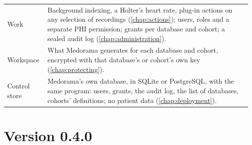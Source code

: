 \begin{table}[htbp]
\begin{tabularx}{\linewidth}{@{}P{2.9cm}L@{}}
Work & Background indexing, a Holter's heart rate, plug-in actions on any selection of
  recordings (\cref{chap:actions}); users, roles and a separate PHI permission; grants per
  database and cohort; a sealed audit log (\cref{chap:administration}). \\
Workspace & What Medorama generates for each database and cohort, encrypted with that
  database's or cohort's own key (\cref{chap:protecting}). \\
Control store & Medorama's own database, in SQLite or PostgreSQL, with the same program: users,
  grants, the audit log, the list of databases, cohorts' definitions; no patient data
  (\cref{chap:deployment}). \\
\bottomrule
\end{tabularx}
\end{table}

\section{Version 0.4.0}
\label{sec:introduction-version}

